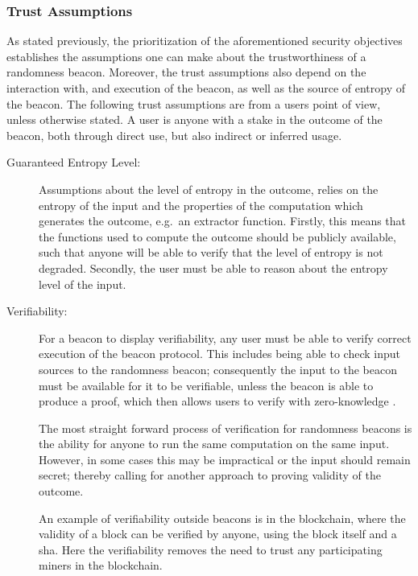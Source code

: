 \subsubsection{Trust Assumptions}\label{ssub:trust_assumptions}
As stated previously, the prioritization of the aforementioned security objectives establishes the assumptions one can make about the trustworthiness of a randomness beacon.
Moreover, the trust assumptions also depend on the interaction with, and execution of the beacon, as well as the source of entropy of the beacon.
The following trust assumptions are from a users point of view, unless otherwise stated.
A user is anyone with a stake in the outcome of the beacon, both through direct use, but also indirect or inferred usage.
\begin{description}

    \item [Guaranteed Entropy Level:]
        Assumptions about the level of entropy in the outcome, relies on the entropy of the input and the properties of the computation which generates the outcome, e.g.\ an extractor function.
        Firstly, this means that the functions used to compute the outcome should be publicly available, such that anyone will be able to verify that the level of entropy is not degraded.
        Secondly, the user must be able to reason about the entropy level of the input.

    \item [Verifiability:]
        For a beacon to display verifiability, any user must be able to verify correct execution of the beacon protocol.
        This includes being able to check input sources to the randomness beacon;
        consequently the input to the beacon must be available for it to be verifiable, unless the beacon is able to produce a proof, which then allows users to verify with zero-knowledge .

        The most straight forward process of verification for randomness beacons is the ability for anyone to run the same computation on the same input.
        However, in some cases this may be impractical or the input should remain secret; thereby calling for another approach to proving validity of the outcome.

        An example of verifiability outside beacons is in the blockchain, where the validity of a block can be verified by anyone, using the block itself and a \acrfull{sha}.
        Here the verifiability removes the need to trust any participating miners in the blockchain.


\end{description}
